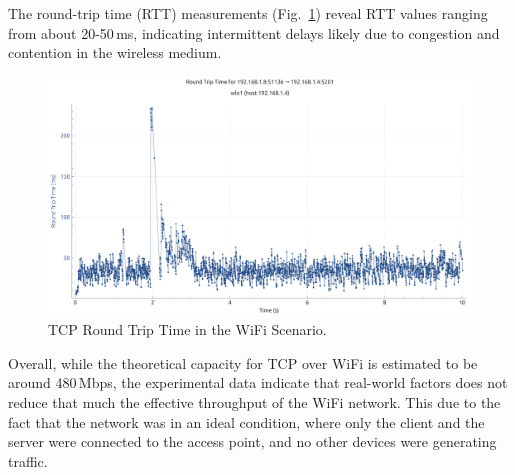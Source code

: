 \begin{enumerate}
                The round-trip time (RTT) measurements (Fig.~\ref{fig:rtt-wifi-tcp}) reveal RTT values ranging from about 20-50\,ms, indicating intermittent delays likely due to congestion and contention in the wireless medium. \\
                
                \begin{figure}[ht]
                    \centering
                    \includegraphics[width=0.9\columnwidth]{images/graphs/RTT/RTT_WiFi_TCP.pdf}
                    \caption{TCP Round Trip Time in the WiFi Scenario.}
                    \label{fig:rtt-wifi-tcp}
                \end{figure}    

                

                Overall, while the theoretical capacity for TCP over WiFi is estimated to be around 480\,Mbps, the experimental data indicate that real-world factors does not reduce that much the effective throughput of the WiFi network. 
                This due to the fact that the network was in an ideal condition, where only the client and the server were connected to the access point, and no other devices were generating traffic.


\end{enumerate}
